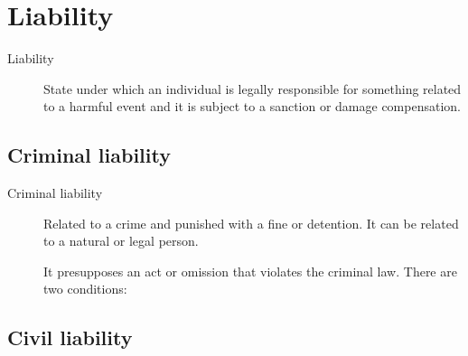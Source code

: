 \section{Liability}

\begin{description}
    \item[Liability] 
        State under which an individual is legally responsible for something related to a harmful event and it is subject to a sanction or damage compensation.
\end{description}


\subsection{Criminal liability}

\begin{description}
    \item[Criminal liability] 
        Related to a crime and punished with a fine or detention. It can be related to a natural or legal person.

        It presupposes an act or omission that violates the criminal law. There are two conditions:
\end{description}


\subsection{Civil liability}

